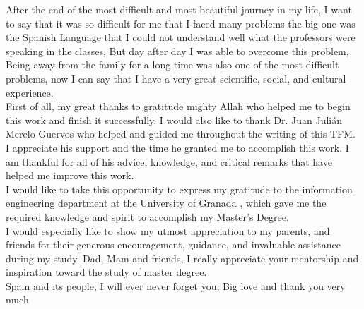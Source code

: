        \vspace{1cm}
       After the end of the most difficult and most beautiful journey in my life,
       I want to say that it was so difficult for me that I faced many problems the big one was the Spanish  Language that I could not understand well what the professors were speaking in the classes, But day after day I was able to overcome this problem, Being away from the family for a long time was also one of the most difficult problems, now I can say that I have a very great scientific, social, and cultural experience.\\
First of all, my great thanks to gratitude mighty Allah who helped me to begin this work and finish it successfully.
I would also like to thank \textsf{Dr. Juan Julián Merelo Guervos} who helped and guided me throughout the writing of this TFM. I appreciate his support and the time he granted me to accomplish this work. I am thankful for all of his advice, knowledge, and critical remarks that have helped me improve this work.\\
I would like to take this opportunity to express my gratitude to the information engineering department at the University of Granada , which gave me the required knowledge and spirit to accomplish my Master’s Degree.\\
I would especially like to show my utmost appreciation to my parents, and friends for their generous encouragement, guidance, and invaluable assistance during my study. Dad, Mam and friends, I really appreciate your mentorship and inspiration toward the study of master degree.\\
Spain and its people, I will ever never forget you, Big love and thank you very much



